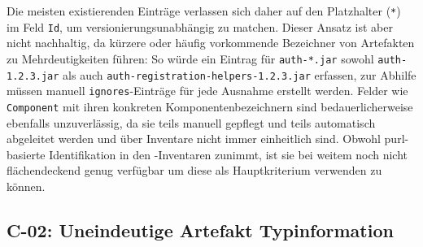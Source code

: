 Die meisten existierenden Einträge verlassen sich daher auf den Platzhalter (\texttt{*}) im Feld \texttt{Id}, um versionierungsunabhängig zu matchen.
Dieser Ansatz ist aber nicht nachhaltig, da kürzere oder häufig vorkommende Bezeichner von Artefakten zu Mehrdeutigkeiten führen:
So würde ein Eintrag für \texttt{auth-*.jar} sowohl \texttt{auth-1.2.3.jar} als auch \texttt{auth-registration-helpers-1.2.3.jar} erfassen, zur Abhilfe müssen manuell \texttt{ignores}-Einträge für jede Ausnahme erstellt werden.
Felder wie \texttt{Component} mit ihren konkreten Komponentenbezeichnern sind bedauerlicherweise ebenfalls unzuverlässig, da sie teils manuell gepflegt und teils automatisch abgeleitet werden und über Inventare nicht immer einheitlich sind.
Obwohl \acrshort{purl}-basierte Identifikation in den \metaeffekt-Inventaren zunimmt, ist sie bei weitem noch nicht flächendeckend genug verfügbar um diese als Hauptkriterium verwenden zu können.

\subsection{C-02: Uneindeutige Artefakt Typinformation}\label{subsec:c-02-uneindeutige-artefakt-typinformation}

%

